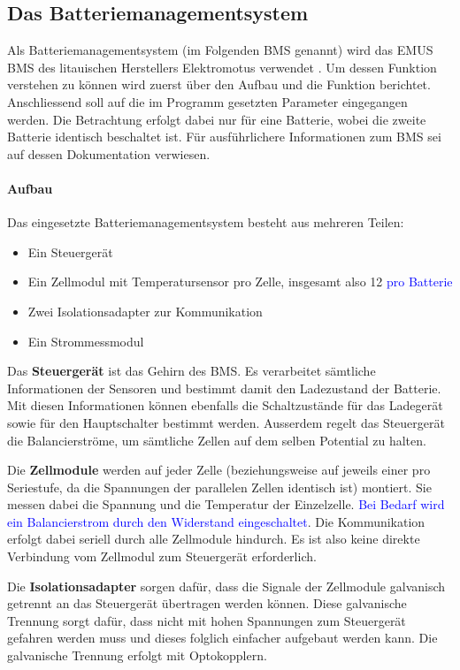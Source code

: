 \subsection{Das Batteriemanagementsystem}

Als Batteriemanagementsystem (im Folgenden BMS genannt) wird das EMUS BMS des litauischen Herstellers Elektromotus verwendet \cite{emus}. Um dessen Funktion verstehen zu können wird zuerst über den Aufbau und die Funktion berichtet. Anschliessend soll auf die im Programm gesetzten Parameter eingegangen werden. Die Betrachtung erfolgt dabei nur für eine Batterie, wobei die zweite Batterie identisch beschaltet ist. Für ausführlichere Informationen zum BMS sei auf dessen Dokumentation \cite{bms} verwiesen.

\paragraph{Aufbau}
Das eingesetzte Batteriemanagementsystem besteht aus mehreren Teilen: \begin{itemize}
	\item Ein Steuergerät
	\item Ein Zellmodul mit Temperatursensor pro Zelle, insgesamt also 12 \textcolor{blue}{pro Batterie}
	\item Zwei Isolationsadapter zur Kommunikation
	\item Ein Strommessmodul
\end{itemize}

Das \textbf{Steuergerät} ist das Gehirn des BMS. Es verarbeitet sämtliche Informationen der Sensoren und bestimmt damit den Ladezustand der Batterie. Mit diesen Informationen können ebenfalls die Schaltzustände für das Ladegerät sowie für den Hauptschalter bestimmt werden. Ausserdem regelt das Steuergerät die Balancierströme, um sämtliche Zellen auf dem selben Potential zu halten.

Die \textbf{Zellmodule} werden auf jeder Zelle (beziehungsweise auf jeweils einer pro Seriestufe, da die Spannungen der parallelen Zellen identisch ist) montiert. Sie messen dabei die Spannung und die Temperatur der Einzelzelle. \textcolor{blue}{Bei Bedarf wird ein Balancierstrom durch den Widerstand eingeschaltet}. Die Kommunikation erfolgt dabei seriell durch alle Zellmodule hindurch. Es ist also keine direkte Verbindung vom Zellmodul zum Steuergerät erforderlich.

Die \textbf{Isolationsadapter} sorgen dafür, dass die Signale der Zellmodule galvanisch getrennt an das Steuergerät übertragen werden können. Diese galvanische Trennung sorgt dafür, dass nicht mit hohen Spannungen zum Steuergerät gefahren werden muss und dieses folglich einfacher aufgebaut werden kann. Die galvanische Trennung erfolgt mit Optokopplern.

